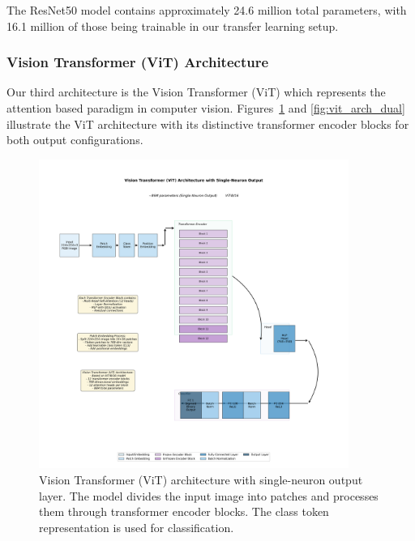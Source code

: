 The ResNet50 model contains approximately 24.6 million total parameters, with 16.1 million of those being trainable in our transfer learning setup.

\FloatBarrier
\subsubsection{Vision Transformer (ViT) Architecture}

Our third architecture is the Vision Transformer (ViT) which represents the attention based paradigm in computer vision. Figures~\ref{fig:vit_arch_single} and \ref{fig:vit_arch_dual} illustrate the ViT architecture with its distinctive transformer encoder blocks for both output configurations.

\begin{figure}[!htbp]
\centering
\includegraphics[width=0.9\textwidth]{figures/vit_1neuron_architecture.png}
\caption{Vision Transformer (ViT) architecture with single-neuron output layer. The model divides the input image into patches and processes them through transformer encoder blocks. The class token representation is used for classification.}
\label{fig:vit_arch_single}
\end{figure}

